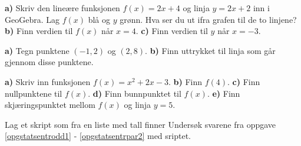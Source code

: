 





\nes

\textbf{a)} Skriv den lineære funksjonen $ {f(x)=2x+4} $ og linja $ {y=2x+2} $ inn i GeoGebra. Lag $ f(x) $ blå og $ y $ grønn. Hva ser du ut ifra grafen til de to linjene?\bs
\textbf{b)} Finn verdien til $ f(x) $ når $ {x=4} $.\bs
\textbf{c)} Finn verdien til $ y $ når $ {x=-3} $.\vsk

\textbf{a)} Tegn punktene $ (-1,2) $ og $ (2,8) $.\bs
\textbf{b)} Finn uttrykket til linja som går gjennom disse punktene.\vsk

\textbf{a)} Skriv inn funksjonen $ {f(x)=x^2+2x-3} $.\bs
\textbf{b)} Finn $ f(4) $.\bs
\textbf{c)} Finn nullpunktene til $ f(x) $.\bs
\textbf{d)} Finn bunnpunktet til $ f(x) $.\bs
\textbf{e)} Finn skjæringspunktet mellom $ f(x) $ og linja $ y=5 $.



\newpage
{}
Lag et skript som fra en liste med tall finner
Undersøk svarene fra {\color{blue}oppgave \ref{opgstatsentrodd1} - \ref{opgstatsentrpar2}} med sriptet.




